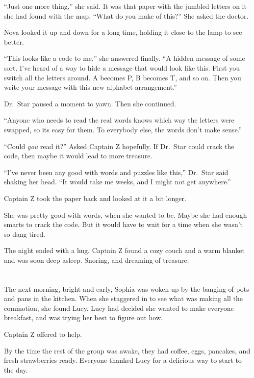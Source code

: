 \documentclass[12pt]{extbook}
\begin{document}
  \enquote{Just one more thing,} she said. It was that paper with the
  jumbled letters on it she had found with the map. \enquote{What do you
  make of this?} She asked the doctor.
  
  Nova looked it up and down for a long time, holding it close to the lamp
  to see better.
  
  \enquote{This looks like a code to me,} she answered finally. \enquote{A
  hidden message of some sort. I've heard of a way to hide a message that
  would look like this. First you switch all the letters around. A becomes
  P, B becomes T, and so on. Then you write your message with this new
  alphabet arrangement.}
  
  Dr.~Star paused a moment to yawn. Then she continued.
  
  \enquote{Anyone who needs to read the real words knows which way the
  letters were swapped, so its easy for them. To everybody else, the words
  don't make sense.}
  
  \enquote{Could \emph{you} read it?} Asked Captain Z hopefully. If
  Dr.~Star could crack the code, then maybe it would lead to more
  treasure.
  
  \enquote{I've never been any good with words and puzzles like this,}
  Dr.~Star said shaking her head. \enquote{It would take me weeks, and I
  might not get anywhere.}
  
  Captain Z took the paper back and looked at it a bit longer.
  
  She was pretty good with words, when she wanted to be. Maybe she had
  enough smarts to crack the code. But it would have to wait for a time
  when she wasn't so dang tired.
  
  The night ended with a hug. Captain Z found a cozy couch and a warm
  blanket and was soon deep asleep. Snoring, and dreaming of treasure.
  
  \section{}\label{section-29}
  
  The next morning, bright and early, Sophia was woken up by the banging
  of pots and pans in the kitchen. When she staggered in to see what was
  making all the commotion, she found Lucy. Lucy had decided she wanted to
  make everyone breakfast, and was trying her best to figure out how.
  
  Captain Z offered to help.
  
  By the time the rest of the group was awake, they had coffee, eggs,
  pancakes, and fresh strawberries ready. Everyone thanked Lucy for a
  delicious way to start to the day.
  
\end{document}
